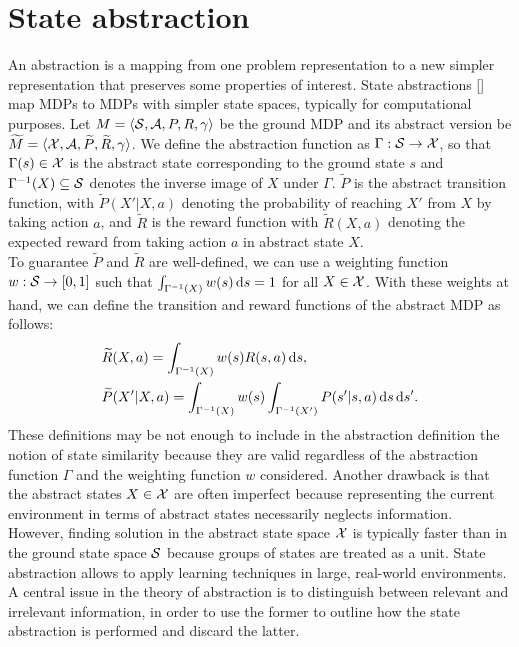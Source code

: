 \section{State abstraction} \label{sec:stdisc}

An abstraction is a mapping from one problem representation to a new simpler representation that preserves some properties of interest. State abstractions [\cite{lihong2006towards}] map \ac{MDPs} to \ac{MDPs} with simpler state spaces, typically for computational purposes. Let $ M = \langle \mathcal{S}, \mathcal{A}, P, R, \gamma \rangle$ be the ground \ac{MDP} and its abstract version be $\widetilde{M} = \langle \mathcal{X}, \mathcal{A}, \widetilde{P}, \widetilde{R}, \gamma \rangle$. We define the abstraction function as $\Gamma: \mathcal{S} \to \mathcal{X}$, so that $\Gamma(s)\in\mathcal{X}$ is the abstract state corresponding to the ground state $s$ and $\Gamma^{-1}(X)\subseteq\mathcal{S}$ denotes the inverse image of $X$ under $\Gamma$. $\widetilde{P}$ is the abstract transition function, with $\widetilde{P}(X'|X,a)$ denoting the probability of reaching $X'$ from $X$ by taking action $a$, and $\widetilde{R}$ is the reward function with $\widetilde{R}(X,a)$ denoting the expected reward from taking action $a$ in abstract state $X$.\\
\newline
To guarantee $\widetilde{P}$ and $\widetilde{R}$ are well-defined, we can use a weighting function  $w: \mathcal{S} \to [0, 1]$ such that $\int_{\Gamma^{-1}(X)} w(s)\,\mathrm{d} s = 1$ for all $X \in \mathcal{X}$. With these weights at hand, we can define the transition and reward functions of the abstract \ac{MDP} as follows:
%
\begin{align}
&\widetilde{R}(X,a) = \int_{\Gamma^{-1}(X)}w(s)R(s,a)\,\mathrm{d} s,\nonumber \\
&\widetilde{P}(X'|X,a) = \int_{\Gamma^{-1}(X)}w(s)\int_{\Gamma^{-1}(X')} P(s'|s,a)\,\mathrm{d} s\,\mathrm{d} s'.\nonumber
\end{align}
%
These definitions may be not enough to include in the abstraction definition the notion of state similarity because they are valid regardless of the abstraction function $\Gamma$ and the weighting function $w$ considered. Another drawback is that the abstract states $X \in \mathcal{X}$ are often imperfect because representing the current environment in terms of abstract states necessarily neglects information. However, finding solution in the abstract state space $\mathcal{X}$ is typically faster than in the ground state space $\mathcal{S}$ because groups of states are treated as a unit. State abstraction allows to apply learning techniques in large, real-world environments. A central issue in the theory of abstraction is to distinguish between relevant and irrelevant information, in order to use the former to outline how the state abstraction is performed and discard the latter.\\
